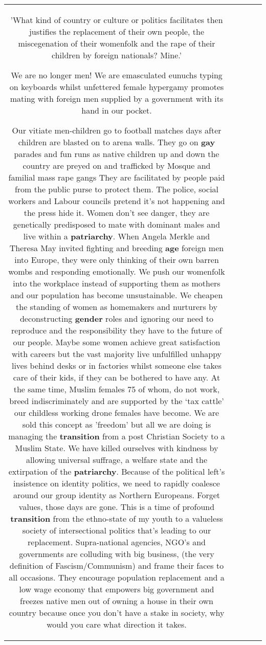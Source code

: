 \documentclass[11pt]{article}
\newlength\mylength
\begin{document}
\begin{center}
\begin{longtable}{|C{.65\mylength}|C{.30\mylength}|C{.12\mylength}|C{.12\mylength}|C{.12\mylength}|}
'What kind of country or culture or politics facilitates then justifies the replacement of their own people, the miscegenation of their womenfolk and the rape of their children by foreign nationals? Mine.'

We are no longer men! We are emasculated eunuchs typing on keyboards whilst unfettered female hypergamy promotes mating with foreign men supplied by a government with its hand in our pocket. 

Our vitiate men-children go to football matches days after children are blasted on to arena walls. They go on \textbf{g\textbf{ay}} parades and fun runs as native children up and down the country are preyed on and trafficked by Mosque and familial mass rape gangs They are facilitated by people paid from the public purse to protect them. The police, social workers and Labour councils pretend it's not happening and the press hide it.
Women don't see danger, they are genetically predisposed to mate with dominant males and live within a \textbf{patriarchy}. When Angela Merkle and Theresa May invited fighting and breeding \textbf{age} foreign men into Europe, they were only thinking of their own barren wombs and responding emotionally. 
We push our womenfolk into the workplace instead of supporting them as mothers and our population has become unsustainable. We cheapen the standing of women as homemakers and nurturers by deconstructing \textbf{gender} roles and ignoring our need to reproduce and the responsibility they have to the future of our people. Maybe some women achieve great satisfaction with careers but the vast majority live unfulfilled unhappy lives behind desks or in factories whilst someone else takes care of their kids, if they can be bothered to have any. At the same time, Muslim females 75 of whom, do not work, breed indiscriminately and are supported by the ‘tax cattle' our childless working drone females have become. We are sold this concept as 'freedom' but all we are doing is managing the \textbf{transition} from a post Christian Society to a Muslim State.  
We have killed ourselves with kindness by allowing universal suffrage, a welfare state and the extirpation of the \textbf{patriarchy}.   
Because of the political left's insistence on identity politics, we need to rapidly coalesce around our group identity as Northern Europeans. Forget values, those days are gone. This is a time of profound \textbf{transition} from the ethno-state of my youth to a valueless society of intersectional politics that's leading to our replacement. 
Supra-national agencies, NGO's and governments are colluding with big business, (the very definition of Fascism/Communism) and frame their faces to all occasions. They encourage population replacement and a low wage economy that empowers big government and freezes native men out of owning a house in their own country because once you don't have a stake in society, why would you care what direction it takes. 

\end{longtable}
\end{center}
\end{document}
